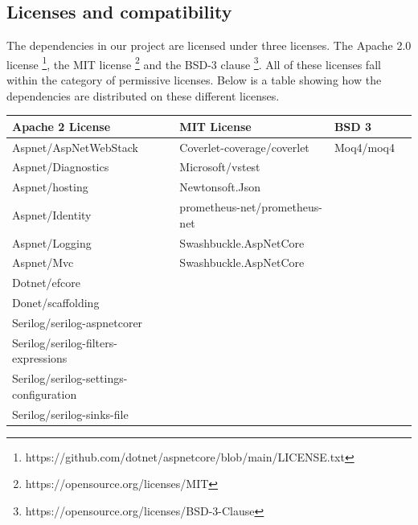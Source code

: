 \documentclass{article}
\begin{document}
\subsection{Licenses and compatibility}
The dependencies in our project are licensed under three licenses. The Apache 2.0 license \footnote{https://github.com/dotnet/aspnetcore/blob/main/LICENSE.txt}, the MIT license \footnote{https://opensource.org/licenses/MIT} and the BSD-3 clause \footnote{https://opensource.org/licenses/BSD-3-Clause}. All of these licenses fall within the category of permissive licenses. 
Below is a table showing how the dependencies are distributed on these different licenses. 
\begin{table}[H]
    \small
    \begin{tabular}{|l|l|l|l|}
        \hline
        Apache 2 License                            & MIT License                 & BSD 3      \\ \hline
       Aspnet/AspNetWebStack                  & Coverlet-coverage/coverlet    & Moq4/moq4      \\
       Aspnet/Diagnostics                     & Microsoft/vstest              &                \\
       Aspnet/hosting                         & Newtonsoft.Json               &                \\
       Aspnet/Identity                        & prometheus-net/prometheus-net &                \\
       Aspnet/Logging                         & Swashbuckle.AspNetCore        &                \\
       Aspnet/Mvc                             & Swashbuckle.AspNetCore        &                \\
       Dotnet/efcore                          &                               &                \\
       Donet/scaffolding                      &                               &                \\
       Serilog/serilog-aspnetcorer            &                               &                \\
       Serilog/serilog-filters-expressions    &                               &                \\
       Serilog/serilog-settings-configuration &                               &                \\
       Serilog/serilog-sinks-file             &                               &                \\

\end{tabular}
\end{table}
\end{document}
